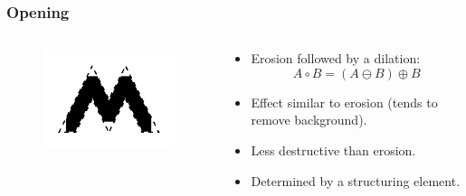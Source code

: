 \begin{frame}
\frametitle{Opening}
\begin{columns}
\begin{column}{.3\textwidth}
\begin{figure}
\centering
\includegraphics[width=\textwidth]{openb.png}
\end{figure}
\end{column}
\begin{column}{.7\textwidth}
\begin{itemize}
\item Erosion followed by a dilation:
\[A \circ B = \left ( A \ominus B  \right ) \oplus B\]
\item Effect similar to erosion (tends to remove background).
\item Less destructive than erosion.
\item Determined by a structuring element.
\end{itemize}
\end{column}
\end{columns}
\end{frame}

